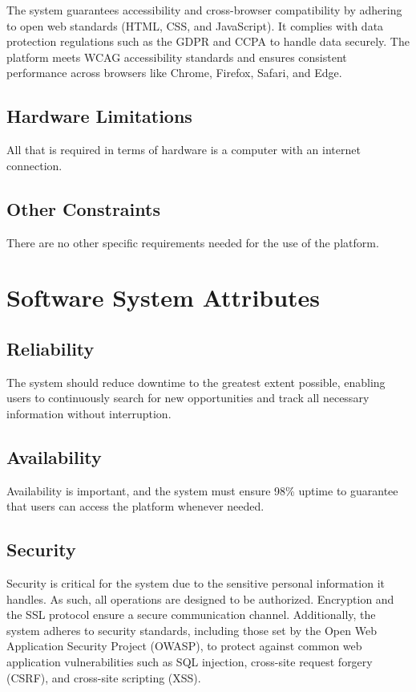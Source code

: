 The system guarantees accessibility and cross-browser compatibility by adhering to open web standards (HTML, CSS, and JavaScript). It complies with data protection regulations such as the GDPR and CCPA to handle data securely. The platform meets WCAG accessibility standards and ensures consistent performance across browsers like Chrome, Firefox, Safari, and Edge.

\subsection{Hardware Limitations}

All that is required in terms of hardware is a computer with an internet connection.

\subsection{Other Constraints}

There are no other specific requirements needed for the use of the platform.

\section{Software System Attributes}

\subsection{Reliability}
The system should reduce downtime to the greatest extent possible, enabling users to continuously search for new opportunities and track all necessary information without interruption.

\subsection{Availability}
Availability is important, and the system must ensure 98\% uptime to guarantee that users can access the platform whenever needed.

\subsection{Security}
Security is critical for the system due to the sensitive personal information it handles. As such, all operations are designed to be authorized. Encryption and the SSL protocol ensure a secure communication channel. Additionally, the system adheres to security standards, including those set by the Open Web Application Security Project (OWASP), to protect against common web application vulnerabilities such as SQL injection, cross-site request forgery (CSRF), and cross-site scripting (XSS).

